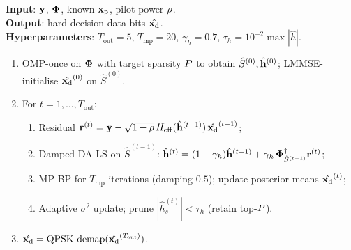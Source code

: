 \begin{algorithm}[t]
\caption{Classical joint OMP-once + iterative LS/MP-BP receiver.}
\label{alg:joint}
\begin{small}
\textbf{Input}: $\mathbf{y}$, $\boldsymbol{\Phi}$, known $\mathbf{x}_{\mathrm{p}}$, pilot power $\rho$. \\
\textbf{Output}: hard-decision data bits $\hat{\mathbf{x}_{\mathrm{d}}}$. \\
\textbf{Hyperparameters}: $T_\text{out}=5$, $T_\text{mp}=20$,
$\gamma_h=0.7$, $\tau_h=10^{-2}\max|\hat{h}|$.
\begin{enumerate}[leftmargin=*,itemsep=1pt,topsep=2pt]
  \item OMP-once on $\boldsymbol{\Phi}$ with target sparsity $P$ to obtain
        $\hat{S}^{(0)},\hat{\mathbf{h}}^{(0)}$; LMMSE-initialise
        $\hat{\mathbf{x}_{\mathrm{d}}}^{(0)}$ on $\hat{S}^{(0)}$.
  \item For $t=1,\dots,T_\text{out}$:
  \begin{enumerate}[leftmargin=*,itemsep=1pt]
    \item Residual $\mathbf{r}^{(t)}=\mathbf{y}-\sqrt{1-\rho}\,H_{\mathrm{eff}}(\hat{\mathbf{h}}^{(t-1)})\,\hat{\mathbf{x}_{\mathrm{d}}}^{(t-1)}$;
    \item Damped DA-LS on $\hat{S}^{(t-1)}$:
          $\hat{\mathbf{h}}^{(t)}=(1-\gamma_h)\hat{\mathbf{h}}^{(t-1)}+\gamma_h\,\boldsymbol{\Phi}_{\hat{S}^{(t-1)}}^{\dagger}\mathbf{r}^{(t)}$;
    \item MP-BP for $T_\text{mp}$ iterations (damping $0.5$); update
          posterior means $\hat{\mathbf{x}_{\mathrm{d}}}^{(t)}$;
    \item Adaptive $\sigma^2$ update; prune
          $|\hat{h}_s^{(t)}|<\tau_h$ (retain top-$P$).
  \end{enumerate}
  \item $\hat{\mathbf{x}_{\mathrm{d}}}=\mathrm{QPSK\text{-}demap}(\hat{\mathbf{x}_{\mathrm{d}}}^{(T_\text{out})})$.
\end{enumerate}
\end{small}
\end{algorithm}


